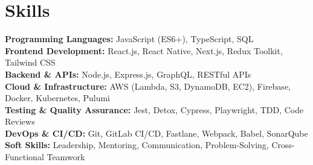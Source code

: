 \section{Skills}
\vspace{2pt}
\resumeSubHeadingListStart
\small{\item{
    \textbf{Programming Languages:}  
    JavaScript (ES6+), TypeScript, SQL \\ \vspace{3pt}
    \textbf{Frontend Development:}  
    React.js, React Native, Next.js, Redux Toolkit, Tailwind CSS \\ \vspace{3pt}
    \textbf{Backend \& APIs:}  
    Node.js, Express.js, GraphQL, RESTful APIs \\ \vspace{3pt}
    \textbf{Cloud \& Infrastructure:}  
    AWS (Lambda, S3, DynamoDB, EC2), Firebase, Docker, Kubernetes, Pulumi \\ \vspace{3pt}
    \textbf{Testing \& Quality Assurance:}  
    Jest, Detox, Cypress, Playwright, TDD, Code Reviews \\ \vspace{3pt}
    \textbf{DevOps \& CI/CD:}  
    Git, GitLab CI/CD, Fastlane, Webpack, Babel, SonarQube \\ \vspace{3pt}
    \textbf{Soft Skills:}  
    Leadership, Mentoring, Communication, Problem-Solving, Cross-Functional Teamwork
}}
\resumeSubHeadingListEnd